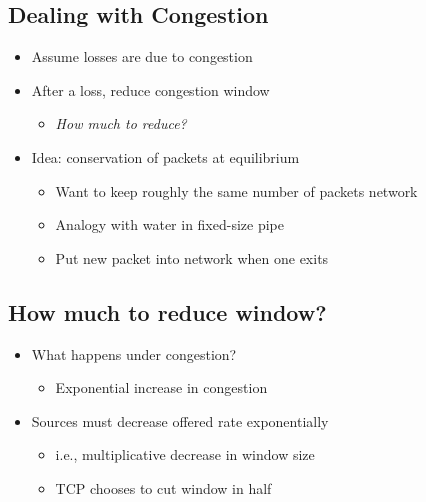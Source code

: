 \subsection{Dealing with Congestion}
\begin{itemize}[nosep]
    \item Assume losses are due to congestion
    \item After a loss, reduce congestion window
          \begin{itemize}[nosep]
              \item \emph{How much to reduce?}
          \end{itemize}
    \item Idea: conservation of packets at equilibrium
          \begin{itemize}[nosep]
              \item Want to keep roughly the same number of packets network
              \item Analogy with water in fixed-size pipe
              \item Put new packet into network when one exits
          \end{itemize}
\end{itemize}

\subsection{How much to reduce window?}
\begin{itemize}[nosep]
    \item What happens under congestion?
          \begin{itemize}[nosep]
              \item Exponential increase in congestion
          \end{itemize}
    \item Sources must decrease offered rate exponentially
          \begin{itemize}[nosep]
              \item i.e., multiplicative decrease in window size
              \item TCP chooses to cut window in half
          \end{itemize}
\end{itemize}

